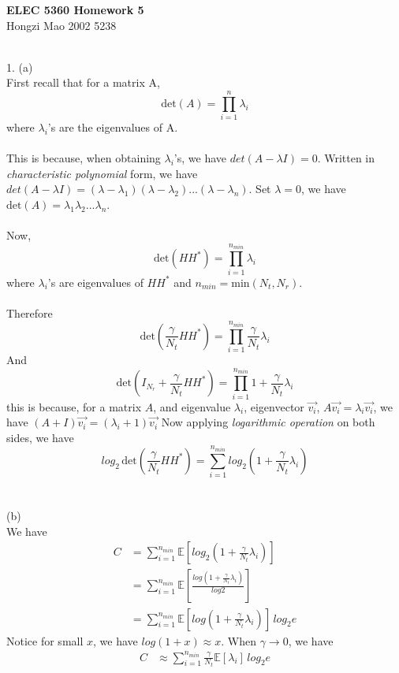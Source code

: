 \documentclass [12pt] {article}
\begin{document}
\begin{spacing}{1.5}
\begin{center}
\small
\textbf{ELEC 5360 Homework 5}\\ Hongzi Mao 2002 5238\\
\end{center}
\normalsize
~\\
1. (a)\\
First recall that for a matrix A, $$\text{det}(A) = \prod_{i=1}^n \lambda_i$$ where $\lambda_i$'s are the eigenvalues of A.\\
~\\
This is because, when obtaining $\lambda_i$'s, we have $det(A-\lambda I) = 0$. Written in \emph{characteristic polynomial} form, we have $det(A-\lambda I) = (\lambda - \lambda_1)(\lambda - \lambda_2) ... (\lambda - \lambda_n)$. Set $\lambda = 0$, we have $\text{det}(A) = \lambda_1\lambda_2...\lambda_n$.\\
~\\
Now, $$\text{det}(H H^*) = \prod_{i=1}^{n_{min}}\lambda_i$$ where $\lambda_i$'s are eigenvalues of $HH^*$ and $n_{min} =\text{min}(N_t, N_r)$.\\
~\\
Therefore  $$\text{det}(\frac{\gamma}{N_t}H H^*) = \prod_{i=1}^{n_{min}}\frac{\gamma}{N_t}\lambda_i$$
And $$\text{det}(I_{N_r}+\frac{\gamma}{N_t}H H^*) = \prod_{i=1}^{n_{min}}1+\frac{\gamma}{N_t}\lambda_i$$ this is because, for a matrix $A$, and eigenvalue $\lambda_i$, eigenvector $\vec{v_i}$, $A \vec{v_i} = \lambda_i \vec{v_i}$, we have   $(A+I) \vec{v_i} = (\lambda_i+1) \vec{v_i}$
Now applying \emph{logarithmic operation} on both sides, we have $$ log_2\,\text{det}(\frac{\gamma}{N_t}H H^*) = \sum_{i=1}^{n_{min}}log_2(1+\frac{\gamma}{N_t}\lambda_i) $$ 
~\\
\pagebreak
~\\
(b)\\
We have 
\begin{align*}
 C &= \sum_{i=1}^{n_{min}} \mathbb{E}[log_2(1+\frac{\gamma}{N_t}\lambda_i)]\\
 &= \sum_{i=1}^{n_{min}}\mathbb{E}[\frac{log(1+\frac{\gamma}{N_t}\lambda_i)}{log2}]\\
 & = \sum_{i=1}^{n_{min}}\mathbb{E}[log(1+\frac{\gamma}{N_t}\lambda_i)] \, log_2e
 \end{align*}
 Notice for small $x$, we have $log(1+x) \approx x$.
 When $\gamma \to 0$, we have 
 \begin{align*}
 C &\approx \sum_{i=1}^{n_{min}}\frac{\gamma}{N_t}\mathbb{E}[\lambda_i] \, log_2e\\

\end{align*}
\end{spacing}
\end{document}
